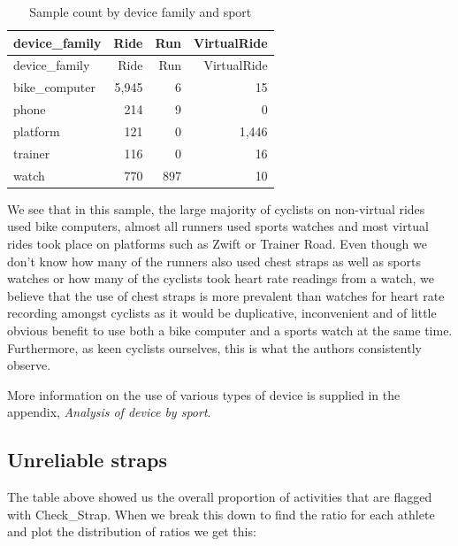 \documentclass[
  letterpaper,
  DIV=11,
  numbers=noendperiod]{scrartcl}
\begin{document}
\begin{longtable}[]{@{}lrrr@{}}
\caption{Sample count by device family and sport}\tabularnewline
\toprule\noalign{}
device\_family & Ride & Run & VirtualRide \\
\midrule\noalign{}
\endfirsthead
\toprule\noalign{}
device\_family & Ride & Run & VirtualRide \\
\midrule\noalign{}
\endhead
\bottomrule\noalign{}
\endlastfoot
bike\_computer & 5,945 & 6 & 15 \\
phone & 214 & 9 & 0 \\
platform & 121 & 0 & 1,446 \\
trainer & 116 & 0 & 16 \\
watch & 770 & 897 & 10 \\
\end{longtable}

We see that in this sample, the large majority of cyclists on
non-virtual rides used bike computers, almost all runners used sports
watches and most virtual rides took place on platforms such as Zwift or
Trainer Road. Even though we don't know how many of the runners also
used chest straps as well as sports watches or how many of the cyclists
took heart rate readings from a watch, we believe that the use of chest
straps is more prevalent than watches for heart rate recording amongst
cyclists as it would be duplicative, inconvenient and of little obvious
benefit to use both a bike computer and a sports watch at the same time.
Furthermore, as keen cyclists ourselves, this is what the authors
consistently observe.

More information on the use of various types of device is supplied in
the appendix, \emph{Analysis of device by sport}.

\subsection{Unreliable straps}\label{unreliable-straps}

The table above showed us the overall proportion of activities that are
flagged with Check\_Strap. When we break this down to find the ratio for
each athlete and plot the distribution of ratios we get this:
\end{document}
